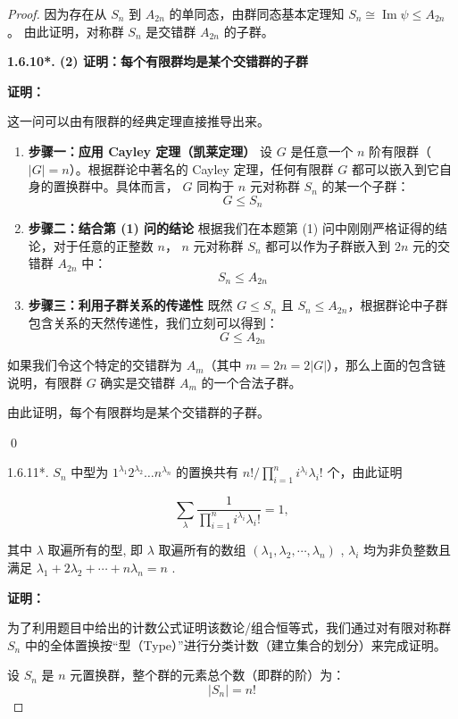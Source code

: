 \documentclass[]{article}
\begin{document}
\begin{proof}
因为存在从 $S_n$ 到 $A_{2n}$ 的单同态，由群同态基本定理知 $S_n \cong \operatorname{Im}\psi \le A_{2n}$。
由此证明，对称群 $S_n$ 是交错群 $A_{2n}$ 的子群。

\bigskip
\noindent \textbf{1.6.10*. (2) 证明：每个有限群均是某个交错群的子群}

\medskip
\noindent \textbf{证明：}

这一问可以由有限群的经典定理直接推导出来。

\begin{enumerate}
	\item \textbf{步骤一：应用 Cayley 定理（凯莱定理）}
	设 $G$ 是任意一个 $n$ 阶有限群（$|G| = n$）。根据群论中著名的 Cayley 定理，任何有限群 $G$ 都可以嵌入到它自身的置换群中。具体而言， $G$ 同构于 $n$ 元对称群 $S_n$ 的某一个子群：
	\[ G \le S_n \]
	
	\item \textbf{步骤二：结合第 (1) 问的结论}
	根据我们在本题第 (1) 问中刚刚严格证得的结论，对于任意的正整数 $n$， $n$ 元对称群 $S_n$ 都可以作为子群嵌入到 $2n$ 元的交错群 $A_{2n}$ 中：
	\[ S_n \le A_{2n} \]
	
	\item \textbf{步骤三：利用子群关系的传递性}
	既然 $G \le S_n$ 且 $S_n \le A_{2n}$，根据群论中子群包含关系的天然传递性，我们立刻可以得到：
	\[ G \le A_{2n} \]
\end{enumerate}

如果我们令这个特定的交错群为 $A_m$（其中 $m = 2n = 2|G|$），那么上面的包含链说明，有限群 $G$ 确实是交错群 $A_m$ 的一个合法子群。

由此证明，每个有限群均是某个交错群的子群。

\qed

1.6.11*. $S_{n}$ 中型为 $1^{\lambda_1}2^{\lambda_2}\dots n^{\lambda_n}$ 的置换共有 $n! / \prod_{i = 1}^{n}i^{\lambda_i}\lambda_i!$ 个，由此证明 

$$
\sum_ {\lambda} \frac {1}{\prod_ {i = 1} ^ {n} i ^ {\lambda_ {i}} \lambda_ {i} !} = 1,
$$

其中 $\lambda$ 取遍所有的型, 即 $\lambda$ 取遍所有的数组 $(\lambda_{1}, \lambda_{2}, \cdots, \lambda_{n})$ , $\lambda_{i}$ 均为非负整数且满足 $\lambda_{1} + 2\lambda_{2} + \cdots + n\lambda_{n} = n$ . 

\bigskip
\noindent \textbf{证明：} 

为了利用题目中给出的计数公式证明该数论/组合恒等式，我们通过对有限对称群 $S_n$ 中的全体置换按“型（Type）”进行分类计数（建立集合的划分）来完成证明。

\bigskip
设 $S_n$ 是 $n$ 元置换群，整个群的元素总个数（即群的阶）为：
\[ |S_n| = n! \]


\end{proof}
\end{document}
